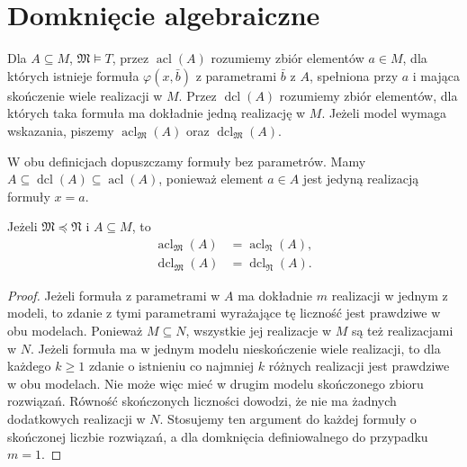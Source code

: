 \section{Domknięcie algebraiczne}

\begin{definicja}
\label{def:mod-acl-dcl}
Dla $A\subseteq M$, $\mathfrak M\models T$,
przez $\operatorname{acl}(A)$ rozumiemy zbiór
elementów $a\in M$, dla których istnieje formuła
$\varphi(x,\bar b)$ z parametrami $\bar b$ z $A$,
spełniona przy $a$ i mająca skończenie wiele
realizacji w $M$.
Przez $\operatorname{dcl}(A)$ rozumiemy zbiór
elementów, dla których taka formuła ma
dokładnie jedną realizację w $M$.
Jeżeli model wymaga wskazania, piszemy
$\operatorname{acl}_{\mathfrak M}(A)$
oraz $\operatorname{dcl}_{\mathfrak M}(A)$.
\end{definicja}

W obu definicjach dopuszczamy formuły bez
parametrów. Mamy
$A\subseteq\operatorname{dcl}(A)\subseteq
\operatorname{acl}(A)$, ponieważ element $a\in A$
jest jedyną realizacją formuły $x=a$.

\begin{lemat}
\label{lem:mod-acl-elementary}
Jeżeli $\mathfrak M\preccurlyeq\mathfrak N$
i $A\subseteq M$, to
\[
\begin{aligned}
\operatorname{acl}_{\mathfrak M}(A)
&=\operatorname{acl}_{\mathfrak N}(A),\\
\operatorname{dcl}_{\mathfrak M}(A)
&=\operatorname{dcl}_{\mathfrak N}(A).
\end{aligned}
\]
\end{lemat}
\begin{proof}
Jeżeli formuła z parametrami w $A$ ma dokładnie
$m$ realizacji w jednym z modeli, to zdanie
z tymi parametrami wyrażające tę liczność
jest prawdziwe w obu modelach.
Ponieważ $M\subseteq N$, wszystkie jej realizacje
w $M$ są też realizacjami w $N$.
Jeżeli formuła ma w jednym modelu nieskończenie
wiele realizacji, to dla każdego $k\geq1$ zdanie
o istnieniu co najmniej $k$ różnych realizacji
jest prawdziwe w obu modelach. Nie może więc
mieć w drugim modelu skończonego zbioru rozwiązań.
Równość skończonych liczności dowodzi, że nie ma
żadnych dodatkowych realizacji w $N$.
Stosujemy ten argument do każdej formuły
o skończonej liczbie rozwiązań, a dla domknięcia
definiowalnego do przypadku $m=1$.
\end{proof}

